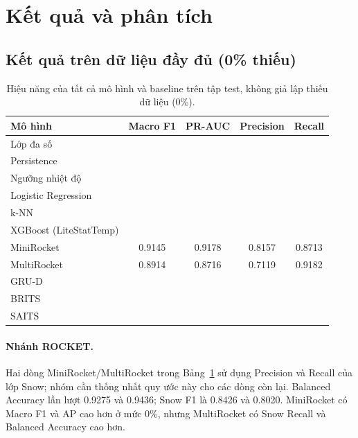 \section{Kết quả và phân tích}
\label{sec:ket-qua-va-phan-tich}

\subsection{Kết quả trên dữ liệu đầy đủ (0\% thiếu)}
\label{sec:ket-qua-du-lieu-day-du}

\begin{table}[H]
\centering
\caption{Hiệu năng của tất cả mô hình và baseline trên tập test, không giả lập thiếu dữ
liệu (0\%).}
\label{tab:ket-qua-day-du}
\begin{tabular}{@{}lcccc@{}}
\toprule
\textbf{Mô hình} & \textbf{Macro F1} & \textbf{PR-AUC} & \textbf{Precision} & \textbf{Recall} \\
\midrule
Lớp đa số & \TODO{} & \TODO{} & \TODO{} & \TODO{} \\
Persistence & \TODO{} & \TODO{} & \TODO{} & \TODO{} \\
Ngưỡng nhiệt độ & \TODO{} & \TODO{} & \TODO{} & \TODO{} \\
Logistic Regression & \TODO{} & \TODO{} & \TODO{} & \TODO{} \\
k-NN & \TODO{} & \TODO{} & \TODO{} & \TODO{} \\
XGBoost (LiteStatTemp) & \TODO{} & \TODO{} & \TODO{} & \TODO{} \\
MiniRocket & 0.9145 & 0.9178 & 0.8157 & 0.8713 \\
MultiRocket & 0.8914 & 0.8716 & 0.7119 & 0.9182 \\
GRU-D & \TODO{} & \TODO{} & \TODO{} & \TODO{} \\
BRITS & \TODO{} & \TODO{} & \TODO{} & \TODO{} \\
SAITS & \TODO{} & \TODO{} & \TODO{} & \TODO{} \\
\bottomrule
\end{tabular}
\end{table}

\paragraph{Nhánh ROCKET.} Hai dòng MiniRocket/MultiRocket trong Bảng~\ref{tab:ket-qua-day-du} sử dụng Precision và Recall của lớp Snow; nhóm cần thống nhất quy ước này cho các dòng còn lại. Balanced Accuracy lần lượt 0.9275 và 0.9436; Snow F1 là 0.8426 và 0.8020. MiniRocket có Macro F1 và AP cao hơn ở mức 0\%, nhưng MultiRocket có Snow Recall và Balanced Accuracy cao hơn.

